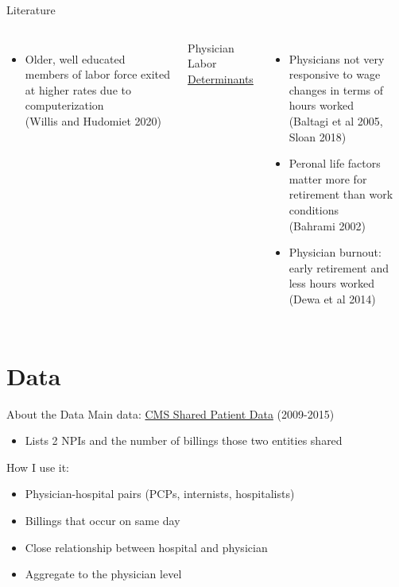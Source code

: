 \documentclass[10pt]{beamer}
\begin{document}
\begin{frame}[noframenumbering]{Literature}
\begin{columns}
\begin{itemize}
            \footnotesize
            
            \item Older, well educated members of labor force exited at higher rates due to computerization \\ \vspace{1mm}
            \tiny (Willis and Hudomiet 2020)
        \end{itemize}
        
        
        \centering
        Physician Labor \underline{ Determinants }
        \begin{itemize}
            \item Physicians not very responsive to wage changes in terms of hours worked \\ \vspace{1mm}
            \tiny (Baltagi et al 2005, Sloan 2018)
            
            \footnotesize
            
            \item Peronal life factors matter more for retirement than work conditions \\ \vspace{1mm}
            \tiny (Bahrami 2002)
            
            \footnotesize
            
            \item Physician burnout: early retirement and less hours worked \\ \vspace{1mm} 
            \tiny (Dewa et al 2014)
        \end{itemize}
\end{columns}
\end{frame}



\section{Data}



\begin{frame}{About the Data}
    Main data: \underline{CMS Shared Patient Data} (2009-2015)
    \begin{itemize}
        \item Lists 2 NPIs and the number of billings those two entities shared
    \end{itemize}
    \vspace{3mm}
    
    How I use it:
    \begin{itemize}
        \item Physician-hospital pairs (PCPs, internists, hospitalists)
        \item Billings that occur on same day
        \item Close relationship between hospital and physician
        \item Aggregate to the physician level
    \end{itemize}
\end{frame}
\end{document}
